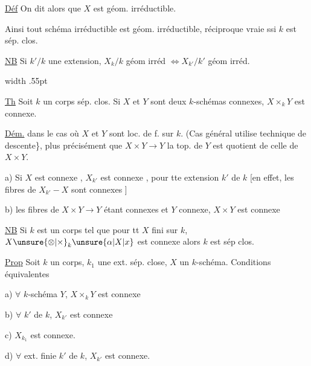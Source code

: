\uline{Déf} On dit alors que $X$ est géom. irréductible.

Ainsi  tout schéma irréductible est géom. irréductible, réciproque vraie ssi $k$ est sép. clos.

\uline{NB} Si $k'/k$ une extension, $X_k/k$ géom irréd $\Longleftrightarrow X_{k'}/k'$ géom irréd. 

 

\noindent\vrule width .55pt\hspace{.5em}\begin{minipage}{.92\linewidth}
\uline{Th} Soit $k$ un corps sép. clos. Si $X$ et $Y$ sont deux $k$-schémas connexes, $X\times_k Y$ est connexe.

\end{minipage}\par
\uline{Dém.} dans le cas où $X$ et $Y$ sont loc. de  f. sur $k$. (Cas général utilise technique de descente\}, plus précisément que $X\times Y\longrightarrow Y$ la top. de $Y$ est quotient de celle de $X\times Y$.

a) Si $X$ est connexe , $X_{k'}$ est connexe , pour tte extension $k'$ de $k$ [en effet, les fibres de $X_{k'}-X$ sont connexes ]

b) les fibres de $X\times Y\to Y$ étant connexes  et $Y$ connexe, $X\times Y$ est connexe

\uline{NB} Si $k$ est un corps tel que pour tt $X$  fini sur $k$, $X\unsure{\otimes|\times}_k \unsure{\alpha|X|x}$ est connexe alors $k$ est sép clos.

\uline{Prop} Soit $k$ un corps, $k_1$ une ext.  sép. close, $X$ un $k$-schéma. Conditions équivalentes

a) $\forall$ $k$-schéma $Y$, $X\times_k Y$ est connexe

b) $\forall$  $k'$ de $k$, $X_{k'}$ est connexe

c)  $X_{k_1}$ est connexe.

d) $\forall$ ext. finie  $k'$ de $k$, $X_{k'}$ est connexe.


